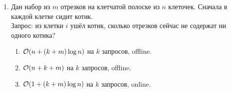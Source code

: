 \begin{enumerate}
  \item
	Дан набор из $m$ отрезков на клетчатой полоске из $n$ клеточек. Сначала в каждой клетке сидит котик.\\
	Запрос: из клетки $i$ ушёл котик, сколько отрезков сейчас не содержат ни одного котика?

    \begin{enumerate}
      \item $\mathcal{O}(n + (k + m)\log{n})$ на $k$ запросов, offline.
      \item $\mathcal{O}(n + k + m)$ на $k$ запросов, offline.
      \item {} $\mathcal{O}(1 + (k + m)\log{n})$ на $k$ запросов, online.
    \end{enumerate}



\end{enumerate}
